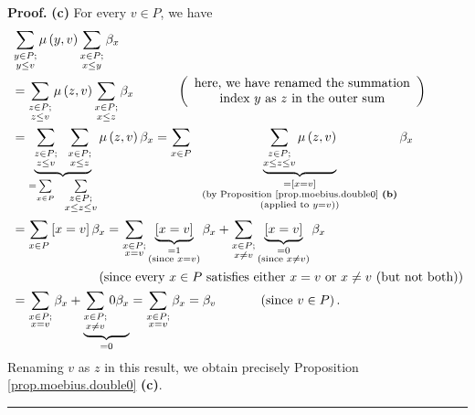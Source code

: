 \documentclass[numbers=enddot,12pt,final,onecolumn,notitlepage]{scrartcl}%
\theoremstyle{definition}
\newenvironment{proof}[1][Proof]{\noindent\textbf{#1.} }{\ \rule{0.5em}{0.5em}}
\newenvironment{vershort}{}{}
\let\sumnonlimits\sum
\renewcommand{\sum}{\sumnonlimits\limits}
\begin{document}
\begin{vershort}
\begin{proof}
\textbf{(c)} For every $v\in P$, we have%
\begin{align*}
&  \sum_{\substack{y\in P;\\y\leq v}}\mu\left(  y,v\right)  \sum
_{\substack{x\in P;\\x\leq y}}\beta_{x}\\
&  =\sum_{\substack{z\in P;\\z\leq v}}\mu\left(  z,v\right)  \sum
_{\substack{x\in P;\\x\leq z}}\beta_{x}\ \ \ \ \ \ \ \ \ \ \left(
\begin{array}
[c]{c}%
\text{here, we have renamed the summation}\\
\text{index }y\text{ as }z\text{ in the outer sum}%
\end{array}
\right) \\
&  =\underbrace{\sum_{\substack{z\in P;\\z\leq v}}\ \ \sum_{\substack{x\in
P;\\x\leq z}}}_{=\sum_{x\in P}\ \ \sum_{\substack{z\in P;\\x\leq z\leq v}}}%
\mu\left(  z,v\right)  \beta_{x}=\sum_{x\in P}\ \ \underbrace{\sum
_{\substack{z\in P;\\x\leq z\leq v}}\mu\left(  z,v\right)  }%
_{\substack{=\left[  x=v\right]  \\\text{(by Proposition
\ref{prop.moebius.double0} \textbf{(b)}}\\\text{(applied to }y=v\text{))}%
}}\beta_{x}\\
&  =\sum_{x\in P}\left[  x=v\right]  \beta_{x}=\sum_{\substack{x\in
P;\\x=v}}\underbrace{\left[  x=v\right]  }_{\substack{=1\\\text{(since
}x=v\text{)}}}\beta_{x}+\sum_{\substack{x\in P;\\x\neq v}}\underbrace{\left[
x=v\right]  }_{\substack{=0\\\text{(since }x\neq v\text{)}}}\beta_{x}\\
&  \ \ \ \ \ \ \ \ \ \ \ \ \ \ \ \ \ \ \ \ \left(  \text{since every }x\in
P\text{ satisfies either }x=v\text{ or }x\neq v\text{ (but not both)}\right)
\\
&  =\sum_{\substack{x\in P;\\x=v}}\beta_{x}+\underbrace{\sum_{\substack{x\in
P;\\x\neq v}}0\beta_{x}}_{=0}=\sum_{\substack{x\in P;\\x=v}}\beta_{x}%
=\beta_{v}\ \ \ \ \ \ \ \ \ \ \left(  \text{since }v\in P\right)  .
\end{align*}
Renaming $v$ as $z$ in this result, we obtain precisely Proposition
\ref{prop.moebius.double0} \textbf{(c)}.
\end{proof}
\end{vershort}
\end{document}
